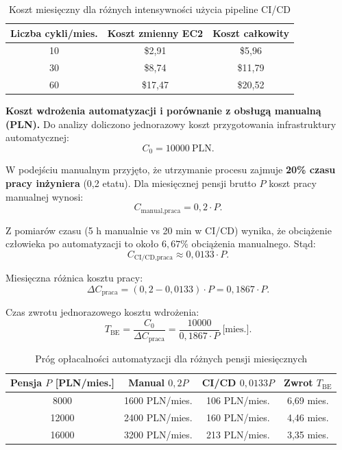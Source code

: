 \begin{table}[H]
\centering
\caption{Koszt miesięczny dla różnych intensywności użycia pipeline CI/CD}
\label{tab:koszty-scenariusze}
\begin{tabular}{|c|c|c|}
\hline
\textbf{Liczba cykli/mies.} & \textbf{Koszt zmienny EC2} & \textbf{Koszt całkowity} \\
\hline
10 & \$2{,}91 & \$5{,}96 \\
\hline
30 & \$8{,}74 & \$11{,}79 \\
\hline
60 & \$17{,}47 & \$20{,}52 \\
\hline
\end{tabular}
\end{table}

\textbf{Koszt wdrożenia automatyzacji i porównanie z obsługą manualną (PLN).}
Do analizy doliczono jednorazowy koszt przygotowania infrastruktury automatycznej:
\[
C_0 = 10000\ \text{PLN}.
\]

W podejściu manualnym przyjęto, że utrzymanie procesu zajmuje \textbf{20\% czasu pracy inżyniera} (0,2 etatu). Dla miesięcznej pensji brutto \(P\) koszt pracy manualnej wynosi:
\[
C_{\text{manual,praca}} = 0{,}2\cdot P.
\]

Z pomiarów czasu (5 h manualnie vs 20 min w CI/CD) wynika, że obciążenie człowieka po automatyzacji to około \(6{,}67\%\) obciążenia manualnego. Stąd:
\[
C_{\text{CI/CD,praca}} \approx 0{,}0133\cdot P.
\]

Miesięczna różnica kosztu pracy:
\[
\Delta C_{\text{praca}} = (0{,}2 - 0{,}0133)\cdot P = 0{,}1867\cdot P.
\]

Czas zwrotu jednorazowego kosztu wdrożenia:
\[
T_{\text{BE}} = \frac{C_0}{\Delta C_{\text{praca}}}
= \frac{10000}{0{,}1867\cdot P}\ \text{[mies.]}.
\]

\begin{table}[H]
\centering
\caption{Próg opłacalności automatyzacji dla różnych pensji miesięcznych}
\label{tab:break-even-pln}
\begin{tabular}{|c|c|c|c|}
\hline
\textbf{Pensja \(P\) [PLN/mies.]} & \textbf{Manual \(0{,}2P\)} & \textbf{CI/CD \(0{,}0133P\)} & \textbf{Zwrot \(T_{\text{BE}}\)} \\
\hline
8000  & 1600 PLN/mies. & 106 PLN/mies. & 6{,}69 mies. \\
\hline
12000 & 2400 PLN/mies. & 160 PLN/mies. & 4{,}46 mies. \\
\hline
16000 & 3200 PLN/mies. & 213 PLN/mies. & 3{,}35 mies. \\
\hline
\end{tabular}
\end{table}

